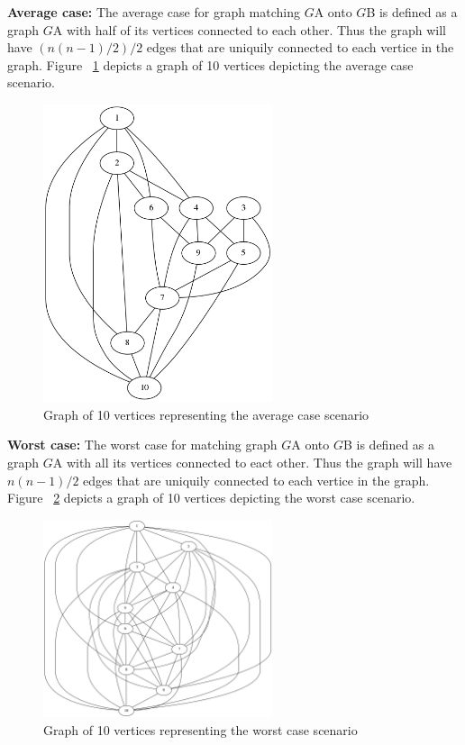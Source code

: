 \textbf{Average case:} The average case for graph matching $G${\tiny A} onto $G${\tiny B} is defined as a graph $G${\tiny A} with half of its vertices connected to each other. Thus the graph will have $(n(n-1) / 2) / 2$ edges that are uniquily connected to each vertice in the graph.
Figure ~\ref{fig:average} depicts a graph of 10 vertices depicting the average case scenario.
\begin{figure}[H]
  \begin{center}
      \includegraphics[width=0.6\textwidth]{average.png}
  \end{center}    
  \caption{Graph of 10 vertices representing the average case scenario}
  \label{fig:average}
\end{figure} 

\textbf{Worst case:} The worst case for matching graph $G${\tiny A} onto $G${\tiny B} is defined as a graph $G${\tiny A} with all its vertices connected to eact other. Thus the graph will have $n(n-1) / 2 $ edges that are uniquily connected to each vertice in the graph.
Figure ~\ref{fig:worst} depicts a graph of 10 vertices depicting the worst case scenario.
\begin{figure}[H]
  \begin{center}
      \includegraphics[width=0.6\textwidth]{worst.png}
  \end{center}    
  \caption{Graph of 10 vertices representing the worst case scenario}
  \label{fig:worst}
\end{figure} 
\newpage
